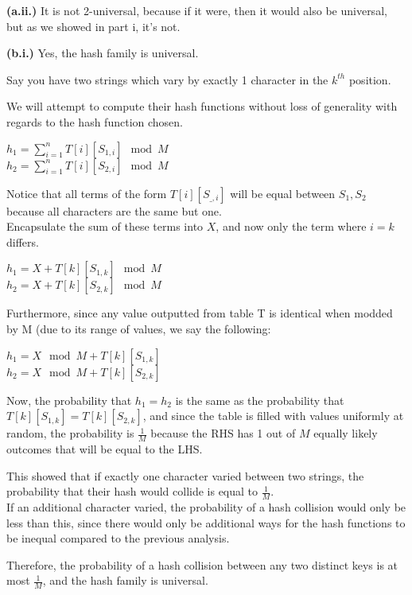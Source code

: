 \documentclass[11pt]{article}
\renewcommand{\part}[1] {\vspace{.10in} {\bf (#1)}}
\begin{document}
\part{a.ii.}
It is not 2-universal, because if it were, then it would also be universal, but as we showed in part i, it's not. 

\part{b.i.}
Yes, the hash family is universal.

Say you have two strings which vary by exactly 1 character in the $k^{th}$ position.

We will attempt to compute their hash functions without loss of generality with regards to the hash function chosen.

$h_1 = \sum_{i=1}^{n} T[i][S_{1,i}] \mod M$\\
$h_2 = \sum_{i=1}^{n} T[i][S_{2,i}] \mod M$

Notice that all terms of the form $T[i][S_{\_,i}]$ will be equal between $S_1, S_2$ because all characters are the same but one.\\
Encapsulate the sum of these terms into $X$, and now only the term where $i=k$ differs.

$h_1 = X + T[k][S_{1,k}] \mod M$\\
$h_2 = X + T[k][S_{2,k}] \mod M$

Furthermore, since any value outputted from table T is identical when modded by M (due to its range of values, we say the following:

$h_1 = X \mod M + T[k][S_{1,k}] $\\
$h_2 = X \mod M + T[k][S_{2,k}] $

Now, the probability that $h_1 = h_2$ is the same as the probability that $T[k][S_{1,k}] = T[k][S_{2,k}]$, and since the table
is filled with values uniformly at random, the probability is $\frac{1}{M}$ because the RHS has 1 out of $M$ equally likely outcomes
that will be equal to the LHS.

This showed that if exactly one character varied between two strings, the probability that their hash would collide is equal to $\frac{1}{M}$.\\
If an additional character varied, the probability of a hash collision would only be less than this, since there would only be additional ways for the hash functions to be inequal compared to the previous analysis.

Therefore, the probability of a hash collision between any two distinct keys is at most $\frac{1}{M}$, and the hash family is universal.
\end{document}
